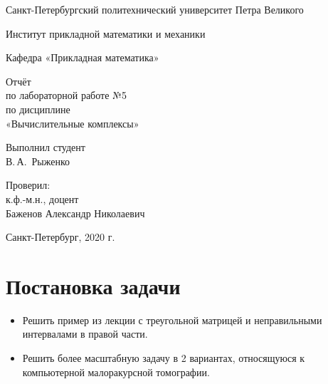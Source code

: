 \documentclass[12pt,a4paper]{scrartcl}
\begin{document}
\begin{titlepage}
  \begin{center}

    Санкт-Петербургский политехнический университет Петра Великого

    \vspace{0.25cm}
    
    Институт прикладной математики и механики
    
    Кафедра «Прикладная математика»
    \vfill

	\vspace{0.25cm}
	    Отчёт\\
	по лабораторной работе №5\\
	по дисциплине\\
	«Вычислительные комплексы»

  \bigskip

\end{center}
\vfill

\newlength{\ML}
\hfill\begin{minipage}{0.4\textwidth}
  Выполнил студент\\ В.\,А.~Рыженко\\
\end{minipage}%
\bigskip

\hfill\begin{minipage}{0.4\textwidth}
  Проверил:\\
к.ф.-м.н., доцент\\
Баженов Александр Николаевич\\
\end{minipage}%
\vfill

\begin{center}
  Санкт-Петербург, 2020 г.
\end{center}
\end{titlepage}

\tableofcontents
\newpage


\section{Постановка задачи}

\begin{itemize}
    \item Решить пример из лекции с треугольной матрицей и неправильными интервалами в правой части.
    \item Решить более масштабную задачу в 2 вариантах, относящуюся к компьютерной малоракурсной томографии.
\end{itemize}
\end{document}
